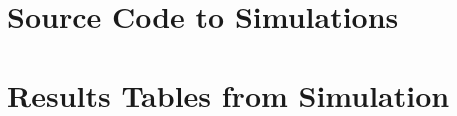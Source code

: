 \documentclass[11pt, a4paper]{book}
\begin{document}



%
\appendix 
\chapter{Source Code to Simulations}


\chapter{Results Tables from Simulation}

%


%
%
%
%



\backmatter




\printindex
\end{document}
